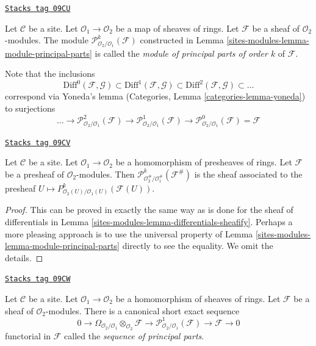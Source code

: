 \begin{definition}
\label{sites-modules-definition-module-principal-parts}
\href{https://stacks.math.columbia.edu/tag/09CU}{\texttt{Stacks tag 09CU}}

Let $\mathcal{C}$ be a site.
Let $\mathcal{O}_1 \to \mathcal{O}_2$ be a map of sheaves of rings.
Let $\mathcal{F}$ be a sheaf of $\mathcal{O}_2$-modules.
The module $\mathcal{P}^k_{\mathcal{O}_2/\mathcal{O}_1}(\mathcal{F})$
constructed in Lemma \ref{sites-modules-lemma-module-principal-parts}
is called the {\it module of principal parts of order $k$} of $\mathcal{F}$.
\end{definition}

Note that the inclusions
$$
\text{Diff}^0(\mathcal{F}, \mathcal{G}) \subset
\text{Diff}^1(\mathcal{F}, \mathcal{G}) \subset
\text{Diff}^2(\mathcal{F}, \mathcal{G}) \subset \ldots
$$
correspond via Yoneda's lemma (Categories, Lemma \ref{categories-lemma-yoneda})
to surjections
$$
\ldots \to \mathcal{P}^2_{\mathcal{O}_2/\mathcal{O}_1}(\mathcal{F})
\to \mathcal{P}^1_{\mathcal{O}_2/\mathcal{O}_1}(\mathcal{F})
\to \mathcal{P}^0_{\mathcal{O}_2/\mathcal{O}_1}(\mathcal{F}) = \mathcal{F}
$$

\begin{lemma}
\label{sites-modules-lemma-differential-operators-sheafify}
\href{https://stacks.math.columbia.edu/tag/09CV}{\texttt{Stacks tag 09CV}}

Let $\mathcal{C}$ be a site. Let $\mathcal{O}_1 \to \mathcal{O}_2$
be a homomorphism of presheaves of rings. Let $\mathcal{F}$ be a presheaf
of $\mathcal{O}_2$-modules. Then
$\mathcal{P}^k_{\mathcal{O}_2^\#/\mathcal{O}_1^\#}(\mathcal{F}^\#)$
is the sheaf associated to the presheaf
$U \mapsto P^k_{\mathcal{O}_2(U)/\mathcal{O}_1(U)}(\mathcal{F}(U))$.
\end{lemma}

\begin{proof}
This can be proved in exactly the same way as is done for the sheaf
of differentials in Lemma \ref{sites-modules-lemma-differentials-sheafify}.
Perhaps a more pleasing approach is to use the universal property
of Lemma \ref{sites-modules-lemma-module-principal-parts} directly to see the equality.
We omit the details.
\end{proof}

\begin{lemma}
\label{sites-modules-lemma-sequence-of-principal-parts}
\href{https://stacks.math.columbia.edu/tag/09CW}{\texttt{Stacks tag 09CW}}

Let $\mathcal{C}$ be a site. Let $\mathcal{O}_1 \to \mathcal{O}_2$
be a homomorphism of sheaves of rings. Let $\mathcal{F}$ be a sheaf
of $\mathcal{O}_2$-modules. There is a
canonical short exact sequence
$$
0 \to
\Omega_{\mathcal{O}_2/\mathcal{O}_1} \otimes_{\mathcal{O}_2} \mathcal{F} \to
\mathcal{P}^1_{\mathcal{O}_2/\mathcal{O}_1}(\mathcal{F}) \to
\mathcal{F} \to 0
$$
functorial in $\mathcal{F}$ called the {\it sequence of principal parts}.
\end{lemma}

